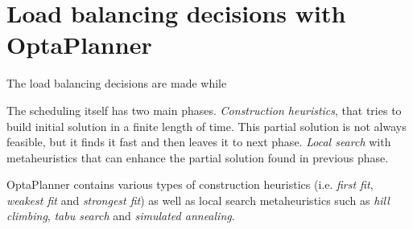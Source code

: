 \section{Load balancing decisions with OptaPlanner}\label{sec:load-balancing-optaplanner}
The load balancing decisions are made while  


The scheduling itself has two main phases.
\textit{Construction heuristics}, that tries to build initial solution in a finite length of time.
This partial solution is not always feasible, 
but it finds it fast and then leaves it to next phase.
\textit{Local search} with metaheuristics that can enhance the partial solution found in previous phase.

OptaPlanner contains various types of construction heuristics (i.e. \textit{first fit}, \textit{weakest fit} and \textit{strongest fit})
as well as local search metaheuristics such as \textit{hill climbing}, \textit{tabu search} and \textit{simulated annealing}.

